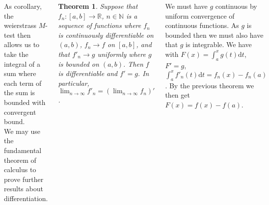 \documentclass{tikzposter} %
\newtheorem{theorem}{Theorem}
\begin{document}
\begin{columns}
{  As corollary, the weierstrass $M$-test then allows us to take the integral of a sum where each term of the sum is bounded with convergent bound. \\

  We may use the fundamental theorem of calculus to prove further results about differentiation.
  \begin{theorem}
    Suppose that $f_{n} : [a,b] \to \mathbb{R}$, $n \in \mathbb{N}$ is a sequence of functions where $f_{n}$ is continuously differentiable on $(a,b)$, $f_{n} \to f$ on $[a,b]$, and that $f'_{n} \to g$ uniformly where $g$ is bounded on $(a,b)$. Then $f$ is differentiable and $f' = g$. In particular, $\lim_{n \to \infty} f'_{n} = (\lim_{n \to \infty} f_{n})'$.
  \end{theorem}
  We must have $g$ continuous by uniform convergence of continuous functions. As $g$ is bounded then we must also have that $g$ is integrable. We have with $F(x) = \int_{a}^{x}g(t)\mathrm{d}t$, $F' = g$, $\int_{a}^{x}f'_{n}(t)\mathrm{d}t = f_{n}(x)-f_{n}(a)$. By the previous theorem we then get $F(x) = f(x)-f(a)$.
}
\end{columns}
\end{document}

